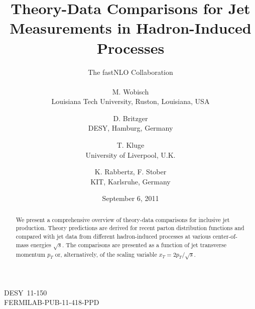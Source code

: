 \documentclass[11pt]{article}
\begin{document}

\date{September 6, 2011}

\title{\boldmath \bf 
Theory-Data Comparisons for Jet Measurements in Hadron-Induced Processes
}
\author{
The fastNLO Collaboration \\ 
\phantom{aaaaaaaaaa aaaaaaaaaaa aaaaaaaaa aaaaaaaaaaa}\\
M. Wobisch \\Louisiana Tech University, Ruston, Louisiana, USA \\
\and
D. Britzger \\  
\phantom{aaaaaaaaaa} DESY, Hamburg, Germany \phantom{aaaaaaaaaa} \\
%
\and
T. Kluge \\   University of Liverpool, U.K. \\
\and
K. Rabbertz, F. Stober \\
 \phantom{aaaaaaaaaa} KIT, Karlsruhe, Germany \phantom{aaaaaaaaaa} 
}


\maketitle

\vskip-11cm
\noindent
\phantom{.}\hfill \mbox{DESY 11-150}\\
\phantom{.}\hfill \mbox{FERMILAB-PUB-11-418-PPD}\\




\vskip4mm
\noindent


\vskip10.1cm

\begin{abstract} \noindent
We present a comprehensive overview of theory-data comparisons
for inclusive jet production.
Theory predictions are derived for recent
parton distribution functions and compared with 
jet data from different hadron-induced processes at 
various center-of-mass energies $\sqrt{s}$.
The comparisons are presented as a function of jet transverse
momentum $p_T$ or, alternatively, 
of the scaling variable $x_T = 2p_T/\sqrt{s}$.
\end{abstract}





\end{document}
